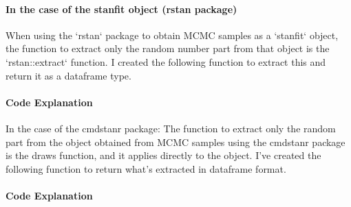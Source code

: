 \documentclass{ltjsbook}
\begin{document}
\paragraph{In the case of the stanfit object (rstan package)}
When using the `rstan` package to obtain MCMC samples as a `stanfit` object, the function to extract only the random number part from that object is the `rstan::extract` function. I created the following function to extract this and return it as a dataframe type.


\paragraph{Code Explanation}



In the case of the cmdstanr package:
The function to extract only the random part from the object obtained from MCMC samples using the cmdstanr package is the draws function, and it applies directly to the object. I've created the following function to return what's extracted in dataframe format.



\paragraph{Code Explanation}

\end{document}
